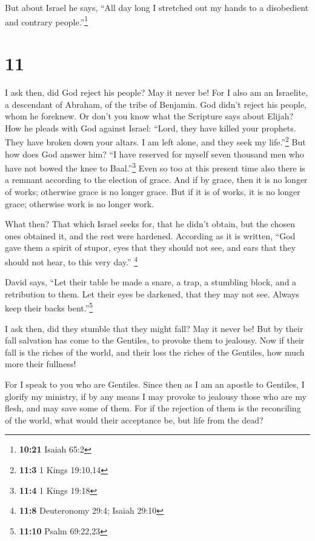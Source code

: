  But about Israel he says, ``All day long I stretched out
my hands to a disobedient and contrary people.''\footnote{\textbf{10:21}
  Isaiah 65:2}

\hypertarget{section-10}{%
\section{11}\label{section-10}}

 I ask then, did God reject his people? May it never be!
For I also am an Israelite, a descendant of Abraham, of the tribe of
Benjamin.  God didn't reject his people, whom he foreknew.
Or don't you know what the Scripture says about Elijah? How he pleads
with God against Israel:  ``Lord, they have killed your
prophets. They have broken down your altars. I am left alone, and they
seek my life.''\footnote{\textbf{11:3} 1 Kings 19:10,14} 
But how does God answer him? ``I have reserved for myself seven thousand
men who have not bowed the knee to Baal.''\footnote{\textbf{11:4} 1
  Kings 19:18}  Even so too at this present time also
there is a remnant according to the election of grace. 
And if by grace, then it is no longer of works; otherwise grace is no
longer grace. But if it is of works, it is no longer grace; otherwise
work is no longer work.

 What then? That which Israel seeks for, that he didn't
obtain, but the chosen ones obtained it, and the rest were hardened.
 According as it is written, ``God gave them a spirit of
stupor, eyes that they should not see, and ears that they should not
hear, to this very day.'' \footnote{\textbf{11:8} Deuteronomy 29:4;
  Isaiah 29:10}

 David says, ``Let their table be made a snare, a trap, a
stumbling block, and a retribution to them.  Let their
eyes be darkened, that they may not see. Always keep their backs
bent.''\footnote{\textbf{11:10} Psalm 69:22,23}

 I ask then, did they stumble that they might fall? May
it never be! But by their fall salvation has come to the Gentiles, to
provoke them to jealousy.  Now if their fall is the
riches of the world, and their loss the riches of the Gentiles, how much
more their fullness!

 For I speak to you who are Gentiles. Since then as I am
an apostle to Gentiles, I glorify my ministry,  if by any
means I may provoke to jealousy those who are my flesh, and may save
some of them.  For if the rejection of them is the
reconciling of the world, what would their acceptance be, but life from
the dead?

